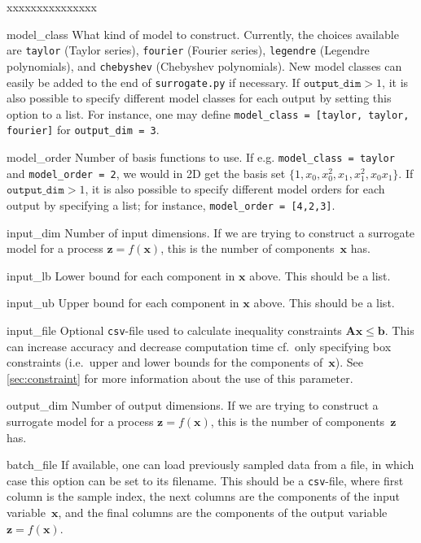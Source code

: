 \documentclass[a4paper,bibliography=numbered]{scrartcl}
\begin{document}
\begin{labeling}{xxxxxxxxxxxxxxx}
    \item[model\_class]
        What kind of model to construct.
        Currently, the choices available are \texttt{taylor} (Taylor series), \texttt{fourier} (Fourier series), \texttt{legendre} (Legendre polynomials), and \texttt{chebyshev} (Chebyshev polynomials).
        New model classes can easily be added to the end of \texttt{surrogate.py} if necessary.
        If $\texttt{output\_dim} > 1$, it is also possible to specify different model classes for each output by setting this option to a list.
        For instance, one may define \texttt{model\_class = [taylor, taylor, fourier]} for \texttt{output\_dim = 3}.
    \item[model\_order]
        Number of basis functions to use.
        If e.g. \texttt{model\_class = taylor} and \texttt{model\_order = 2},
        we would in 2D get the basis set $\{1, x_0, x_0^2, x_1, x_1^2, x_0x_1\}$.
        If $\texttt{output\_dim} > 1$, it is also possible to specify different model orders for each output by specifying a list; for instance, \texttt{model\_order = [4,2,3]}.
    \item[input\_dim]
        Number of input dimensions.
        If we are trying to construct a surrogate model for a process $\bm{z} = f(\bm{x})$, this is the number of components~$\bm{x}$ has.
    \item[input\_lb]
        Lower bound for each component in $\bm{x}$ above. This should be a list.
    \item[input\_ub]
        Upper bound for each component in $\bm{x}$ above. This should be a list.
    \item[input\_file]
        Optional \texttt{csv}-file used to calculate inequality constraints $\bm{A}\bm{x} \leq \bm{b}$.
        This can increase accuracy and decrease computation time cf.\ only specifying box constraints (i.e.\ upper and lower bounds for the components of~$\bm{x}$).
        See \cref{sec:constraint} for more information about the use of this parameter.
    \item[output\_dim]
        Number of output dimensions.
        If we are trying to construct a surrogate model for a process $\bm{z} = f(\bm{x})$, this is the number of components~$\bm{z}$ has.
    \item[batch\_file]
        If available, one can load previously sampled data from a file, in which case this option can be set to its filename.
        This should be a \texttt{csv}-file, where first column is the sample index, the next columns are the components of the input variable~$\bm{x}$, and the final columns are the components of the output variable~$\bm{z} = f(\bm{x})$.

\end{labeling}
\end{document}
